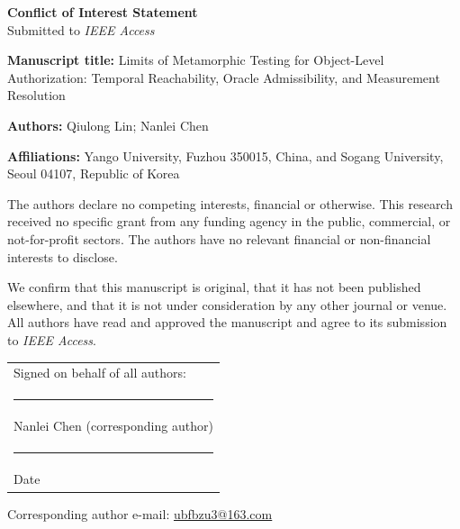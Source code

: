 \documentclass[11pt]{article}
\newcommand{\papertitle}{Limits of Metamorphic Testing for Object-Level
Authorization: Temporal Reachability, Oracle Admissibility, and Measurement
Resolution}
\begin{document}
\begin{center}
{\Large\bfseries Conflict of Interest Statement}\\[0.35em]
{\small Submitted to \emph{IEEE Access}}
\end{center}

\vspace{0.8em}
\noindent\textbf{Manuscript title:} \papertitle

\vspace{0.5em}
\noindent\textbf{Authors:} Qiulong Lin; Nanlei Chen

\vspace{0.5em}
\noindent\textbf{Affiliations:} Yango University, Fuzhou 350015, China, and
Sogang University, Seoul 04107, Republic of Korea

\vspace{1.2em}
\noindent The authors declare no competing interests, financial or otherwise.
This research received no specific grant from any funding agency in the public,
commercial, or not-for-profit sectors. The authors have no relevant financial or
non-financial interests to disclose.

\vspace{0.9em}
\noindent We confirm that this manuscript is original, that it has not been
published elsewhere, and that it is not under consideration by any other journal
or venue. All authors have read and approved the manuscript and agree to its
submission to \emph{IEEE Access}.

\vspace{2.2em}
\noindent\begin{tabular}{@{}p{8cm}@{}}
Signed on behalf of all authors:\\[1.0em]
\rule{6cm}{0.4pt}\\
Nanlei Chen (corresponding author)\\[1.4em]
\rule{6cm}{0.4pt}\\
Date\\
\end{tabular}

\vspace{1.6em}
\noindent Corresponding author e-mail:
\href{mailto:ubfbzu3@163.com}{ubfbzu3@163.com}
\end{document}
